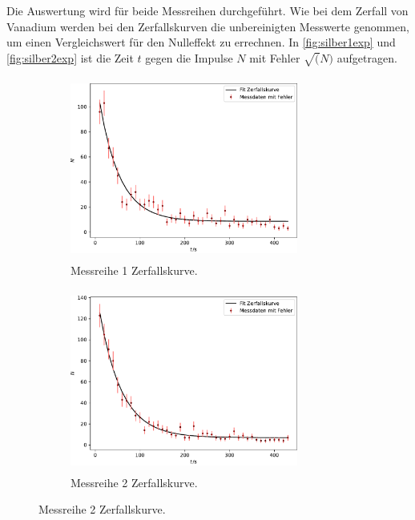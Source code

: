 Die Auswertung wird für beide Messreihen durchgeführt. Wie bei dem Zerfall von Vanadium werden bei den Zerfallskurven die unbereinigten Messwerte genommen, um einen 
Vergleichswert für den Nulleffekt zu errechnen. In \autoref{fig:silber1exp} und \autoref{fig:silber2exp} ist die Zeit $t$ gegen die Impulse $N$ mit Fehler $\sqrt(N)$ aufgetragen.
\begin{figure}[H]
  \centering
  \begin{subfigure}[b]{0.49\textwidth}
      \centering
      \includegraphics[width=7.5cm, height=6cm]{plots/messung1_silber_expfit.pdf}
      \caption[]
      {{\small Messreihe 1 Zerfallskurve.}}    
      \label{fig:silber1exp}
  \end{subfigure}
  \hfill
  \begin{subfigure}[b]{0.49\textwidth}  
      \centering 
      \includegraphics[width=7.5cm, height=6cm]{plots/messung2_silber_expfit.pdf}
      \caption[]
      {{\small Messreihe 2 Zerfallskurve.}}    
      \label{fig:silber2exp}
  \end{subfigure}
\end{figure}

